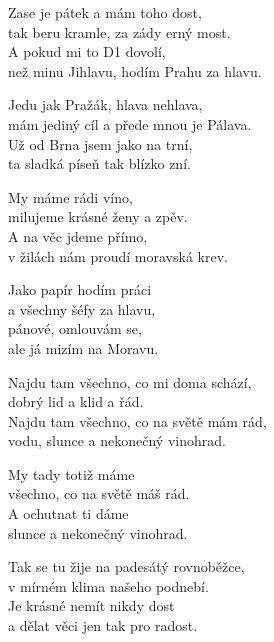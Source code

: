 
\ve{}
Zase je pátek a mám toho dost,\\
tak beru kramle, za zády erný most.\\
A pokud mi to D1 dovolí,\\
než minu Jihlavu, hodím Prahu za hlavu.

\ve{}
Jedu jak Pražák, hlava nehlava,\\
mám jediný cíl a přede mnou je Pálava.\\
Už od Brna jsem jako na trní,\\
ta sladká píseň tak blízko zní.

My máme rádi víno,\\
milujeme krásné ženy a zpěv.\\
A na věc jdeme přímo,\\
v žilách nám proudí moravská krev.


\ve{}
Jako papír hodím práci\\
a všechny šéfy za hlavu,\\
pánové, omlouvám se,\\
ale já mizím na Moravu.

\ve{}
Najdu tam všechno, co mi doma schází,\\
dobrý lid a klid a řád.\\
Najdu tam všechno, co na světě mám rád,\\
vodu, slunce a nekonečný vinohrad.


My tady totiž máme\\
všechno, co na světě máš rád.\\
A ochutnat ti dáme\\
slunce a nekonečný vinohrad.

\ve{}
Tak se tu žije na padesátý rovnoběžce,\\
v mírném klima našeho podnebí.\\
Je krásné nemít nikdy dost\\
a dělat věci jen tak pro radost.


\esong{}

